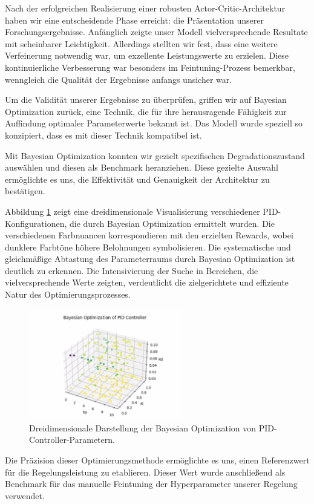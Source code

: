 
% 
% 

\label{sec:Results_Presentation}

Nach der erfolgreichen  Realisierung einer robusten Actor-Critic-Architektur haben wir eine entscheidende Phase erreicht: die Präsentation unserer Forschungsergebnisse. Anfänglich zeigte unser Modell vielversprechende Resultate mit scheinbarer Leichtigkeit. Allerdings stellten wir fest, dass eine weitere Verfeinerung notwendig war, um exzellente Leistungswerte zu erzielen. Diese kontinuierliche Verbesserung war besonders im Feintuning-Prozess bemerkbar, wenngleich die Qualität der Ergebnisse anfangs unsicher war.

Um die Validität unserer Ergebnisse zu überprüfen, griffen wir auf Bayesian Optimization zurück, eine Technik, die für ihre herausragende Fähigkeit zur Auffindung optimaler Parameterwerte bekannt ist. Das Modell wurde speziell so konzipiert, dass es mit dieser Technik kompatibel ist.

Mit Bayesian Optimization konnten wir gezielt spezifischen Degradationszustand auswählen und diesen als Benchmark heranziehen. Diese gezielte Auswahl ermöglichte es uns, die Effektivität und Genauigkeit der Architektur zu bestätigen.

Abbildung \ref{fig:Bayesian_PID_Optimization} zeigt eine dreidimensionale Visualisierung verschiedener PID-Konfigurationen, die durch Bayesian Optimization ermittelt wurden. Die verschiedenen Farbnuancen korrespondieren mit den erzielten Rewards, wobei dunklere Farbtöne höhere Belohnungen symbolisieren. Die systematische und gleichmäßige Abtastung des Parameterraums durch Bayesian Optimization ist deutlich zu erkennen. Die Intensivierung der Suche in Bereichen, die vielversprechende Werte zeigten, verdeutlicht die zielgerichtete und effiziente Natur des Optimierungsprozesses.

\begin{figure}[h]
\centering
\includegraphics[width=0.6\textwidth]{4Ergebnisse/0Bayes_ergebnisse.png}
\caption{Dreidimensionale Darstellung der Bayesian Optimization von PID-Controller-Parametern.}
\label{fig:Bayesian_PID_Optimization}
\end{figure}

Die Präzision dieser Optimierungsmethode ermöglichte es uns, einen Referenzwert für die Regelungsleistung zu etablieren. Dieser Wert wurde anschließend als Benchmark für das manuelle Feintuning der Hyperparameter unserer Regelung verwendet.


